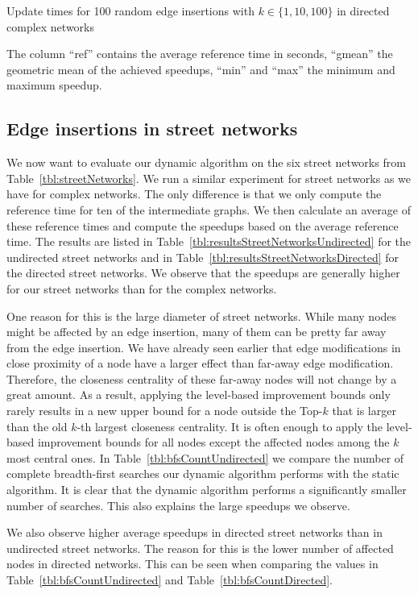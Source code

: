 \begin{landscape}
\begin{table}[h]
\caption{Update times for 100 random edge insertions with  $k \in \{1, 10, 100\}$ in directed complex networks}{The column ``ref'' contains the average reference time in seconds, ``gmean'' the geometric mean of the achieved speedups, ``min'' and ``max'' the minimum and maximum speedup.}
\label{tbl:topkDirectedComplex}
\end{table}
\end{landscape}

\subsection{Edge insertions in street networks}
\label{sec:evaluationEdgeInsertionsStreetNetworks}
We now want to evaluate our dynamic algorithm on the six street networks from Table~\ref{tbl:streetNetworks}. We run a similar experiment for street networks as we have for complex networks. The only difference is that we only compute the reference time for ten of the intermediate graphs. We then calculate an average of these reference times and compute the speedups based on the average reference time. The results are listed in Table~\ref{tbl:resultsStreetNetworksUndirected} for the undirected street networks and in Table~\ref{tbl:resultsStreetNetworksDirected} for the directed street networks. We observe that the speedups are generally higher for our street networks than for the complex networks.

One reason for this is the large diameter of street networks. While many nodes might be affected by an edge insertion, many of them can be pretty far away from the edge insertion. We have already seen earlier that edge modifications in close proximity of a node have a larger effect than far-away edge modification. Therefore, the closeness centrality of these far-away nodes will not change by a great amount. As a result, applying the level-based improvement bounds only rarely results in a new upper bound for a node outside the Top-$k$ that is larger than the old $k$-th largest closeness centrality. It is often enough to apply the level-based improvement bounds for all nodes except the affected nodes among the $k$ most central ones. In Table~\ref{tbl:bfsCountUndirected} we compare the number of complete breadth-first searches our dynamic algorithm performs with the static algorithm. It is clear that the dynamic algorithm performs a significantly smaller number of searches. This also explains the large speedups we observe.

We also observe higher average speedups in directed street networks than in undirected street networks. The reason for this is the lower number of affected nodes in directed networks. This can be seen when comparing the values in Table~\ref{tbl:bfsCountUndirected} and Table~\ref{tbl:bfsCountDirected}.

